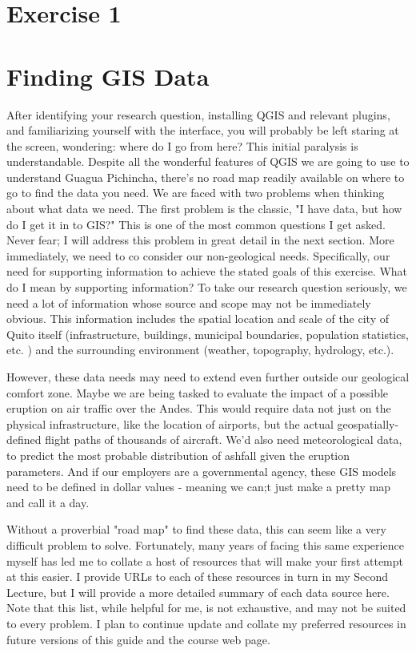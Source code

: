 \documentclass{article}
\begin{document}
\section{Exercise 1}

\section{Finding GIS Data}

After identifying your research question, installing QGIS and relevant plugins, and familiarizing yourself with the interface, you will probably be left staring at the screen, wondering: where do I go from here? This initial paralysis is understandable. Despite all the wonderful features of QGIS we are going to use to understand Guagua Pichincha, there's no road map readily available on where to go to find the data you need. We are faced with two problems when thinking about what data we need. The first problem is the classic, "I have data, but how do I get it in to GIS?" This is one of the most common questions I get asked. Never fear; I will address this problem in great detail in the next section. More immediately, we need to co consider our non-geological needs. Specifically, our need for supporting information to achieve the stated goals of this exercise. What do I mean by supporting information? To take our research question seriously, we need a lot of information whose source and scope may not be immediately obvious. This information includes the spatial location and scale of the city of Quito itself (infrastructure, buildings, municipal boundaries, population statistics, etc. ) and the surrounding environment (weather, topography, hydrology, etc.). 

However, these data needs may need to extend even further outside our geological comfort zone. Maybe we are being tasked to evaluate the impact of a possible eruption on air traffic over the Andes. This would require data not just on the physical infrastructure, like the location of airports, but the actual geospatially-defined flight paths of thousands of aircraft. We'd also need meteorological data, to predict the most probable distribution of ashfall given the eruption parameters. And if our employers are a governmental agency, these GIS models need to be defined in dollar values - meaning we can;t just make a pretty map and call it a day. 

Without a proverbial "road map" to find these data, this can seem like a very difficult problem to solve. Fortunately, many years of facing this same experience myself has led me to collate a host of resources that will make your first attempt at this easier. I provide URLs to each of these resources in turn in my Second Lecture, but I will provide a more detailed summary of each data source here. Note that this list, while helpful for me, is not exhaustive, and may not be suited to every problem. I plan to continue update and collate my preferred resources in future versions of this guide and the course web page.
\end{document}
